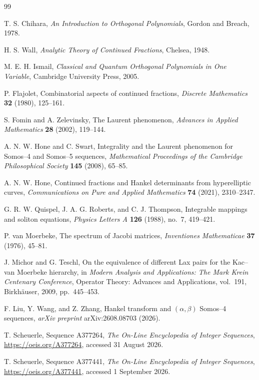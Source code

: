 \documentclass[11pt]{article}
\theoremstyle{remark}
\begin{document}
\begin{thebibliography}{99}

T. S. Chihara,
\emph{An Introduction to Orthogonal Polynomials},
Gordon and Breach, 1978.

H. S. Wall,
\emph{Analytic Theory of Continued Fractions},
Chelsea, 1948.

M. E. H. Ismail,
\emph{Classical and Quantum Orthogonal Polynomials in One Variable},
Cambridge University Press, 2005.

P. Flajolet,
Combinatorial aspects of continued fractions,
\emph{Discrete Mathematics} \textbf{32} (1980), 125--161.

S. Fomin and A. Zelevinsky,
The Laurent phenomenon,
\emph{Advances in Applied Mathematics} \textbf{28} (2002), 119--144.

A. N. W. Hone and C. Swart,
Integrality and the Laurent phenomenon for Somos--4 and Somos--5 sequences,
\emph{Mathematical Proceedings of the Cambridge Philosophical Society}
\textbf{145} (2008), 65--85.

A. N. W. Hone,
Continued fractions and Hankel determinants from hyperelliptic curves,
\emph{Communications on Pure and Applied Mathematics} \textbf{74} (2021), 2310--2347.

G. R. W. Quispel, J. A. G. Roberts, and C. J. Thompson,
Integrable mappings and soliton equations,
\emph{Physics Letters A} \textbf{126} (1988), no.~7, 419--421.

P. van Moerbeke,
The spectrum of Jacobi matrices,
\emph{Inventiones Mathematicae} \textbf{37} (1976), 45--81.

J. Michor and G. Teschl,
On the equivalence of different Lax pairs for the Kac--van Moerbeke hierarchy,
in \emph{Modern Analysis and Applications: The Mark Krein Centenary Conference},
Operator Theory: Advances and Applications, vol.~191,
Birkh\"auser, 2009, pp.~445--453.

F. Liu, Y. Wang, and Z. Zhang,
Hankel transform and $(\alpha,\beta)$ Somos--4 sequences,
\emph{arXiv preprint} arXiv:2608.08703 (2026).

T. Scheuerle,
Sequence A377264,
\emph{The On-Line Encyclopedia of Integer Sequences},
\url{https://oeis.org/A377264}, accessed 31 August 2026.

T. Scheuerle,
Sequence A377441,
\emph{The On-Line Encyclopedia of Integer Sequences},
\url{https://oeis.org/A377441}, accessed 1 September 2026.
\end{thebibliography}
\end{document}
